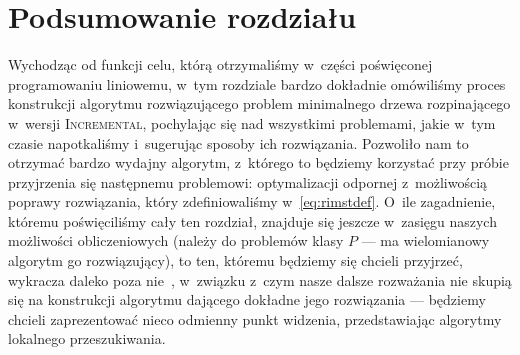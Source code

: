 \section{Podsumowanie rozdziału}




Wychodząc od funkcji celu, którą otrzymaliśmy w~części poświęconej programowaniu liniowemu, w~tym rozdziale bardzo dokładnie omówiliśmy proces konstrukcji algorytmu rozwiązującego problem minimalnego drzewa rozpinającego w~wersji \textsc{Incremental}, pochylając się nad wszystkimi problemami, jakie w~tym czasie napotkaliśmy i~sugerując sposoby ich rozwiązania. Pozwoliło nam to otrzymać bardzo wydajny algorytm, z~którego to będziemy korzystać przy próbie przyjrzenia się następnemu problemowi: optymalizacji odpornej z~możliwością poprawy rozwiązania, który zdefiniowaliśmy w~\ref{eq:rimstdef}. O~ile zagadnienie, któremu poświęciliśmy cały ten rozdział, znajduje się jeszcze w~zasięgu naszych możliwości obliczeniowych (należy do problemów klasy $P$ --- ma wielomianowy algorytm go rozwiązujący), to ten, któremu będziemy się chcieli przyjrzeć, wykracza daleko poza nie~\cite{DBLP:journals/corr/NasrabadiO13}, w~związku z~czym nasze dalsze rozważania nie skupią się na konstrukcji algorytmu dającego dokładne jego rozwiązania --- będziemy chcieli zaprezentować nieco odmienny punkt widzenia, przedstawiając algorytmy lokalnego przeszukiwania.